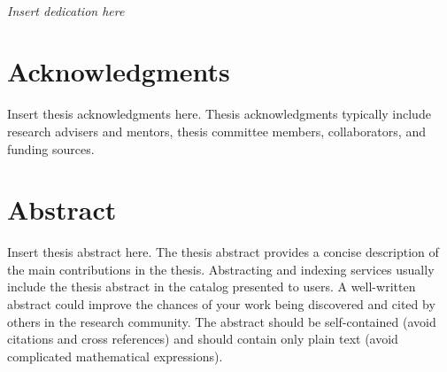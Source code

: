 \clearpage


\begingroup
\centering
{}
~
\\[1in]
\textit{Insert dedication here}
\par
\endgroup

\clearpage


\chapter*{Acknowledgments}

{\color{red}%
Insert thesis acknowledgments here.
Thesis acknowledgments typically include research advisers and mentors, thesis committee members, collaborators, and funding sources.}

\lipsum[1-2]

\clearpage


\chapter*{Abstract}

{\color{red}%
Insert thesis abstract here.
The thesis abstract provides a concise description of the main contributions in the thesis.
Abstracting and indexing services usually include the thesis abstract in the catalog presented to users.
A well-written abstract could improve the chances of your work being discovered and cited by others in the research community.
The abstract should be self-contained (avoid citations and cross references) and should contain only plain text (avoid complicated mathematical expressions).}

\lipsum[1-6]

\clearpage


\tableofcontents

\listoffigures

\listoftables

\clearpage

